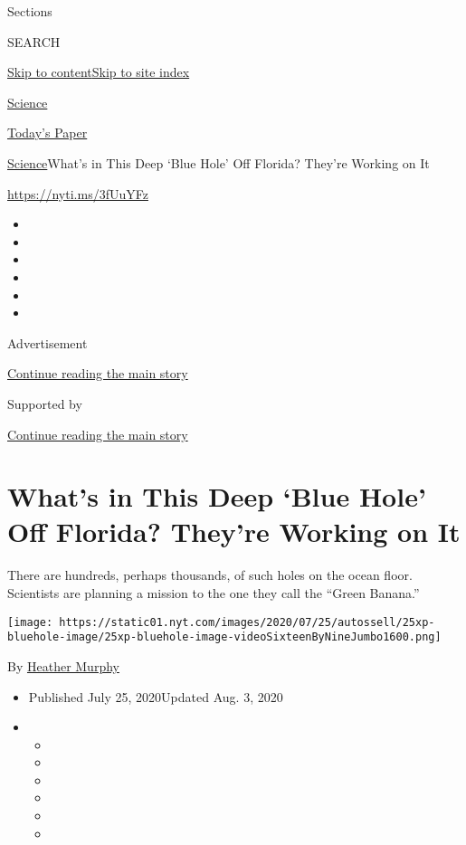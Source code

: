 Sections

SEARCH

\protect\hyperlink{site-content}{Skip to
content}\protect\hyperlink{site-index}{Skip to site index}

\href{https://www.nytimes.com/section/science}{Science}

\href{https://myaccount.nytimes.com/auth/login?response_type=cookie\&client_id=vi}{}

\href{https://www.nytimes.com/section/todayspaper}{Today's Paper}

\href{/section/science}{Science}\textbar{}What's in This Deep `Blue
Hole' Off Florida? They're Working on It

\url{https://nyti.ms/3fUuYFz}

\begin{itemize}
\item
\item
\item
\item
\item
\item
\end{itemize}

Advertisement

\protect\hyperlink{after-top}{Continue reading the main story}

Supported by

\protect\hyperlink{after-sponsor}{Continue reading the main story}

\hypertarget{whats-in-this-deep-blue-hole-off-florida-theyre-working-on-it}{%
\section{What's in This Deep `Blue Hole' Off Florida? They're Working on
It}\label{whats-in-this-deep-blue-hole-off-florida-theyre-working-on-it}}

There are hundreds, perhaps thousands, of such holes on the ocean floor.
Scientists are planning a mission to the one they call the ``Green
Banana.''

\texttt{[image: https://static01.nyt.com/images/2020/07/25/autossell/25xp-bluehole-image/25xp-bluehole-image-videoSixteenByNineJumbo1600.png]}

By \href{https://www.nytimes.com/by/heather-murphy}{Heather Murphy}

\begin{itemize}
\item
  Published July 25, 2020Updated Aug. 3, 2020
\item
  \begin{itemize}
  \item
  \item
  \item
  \item
  \item
  \item
  \end{itemize}
\end{itemize}

